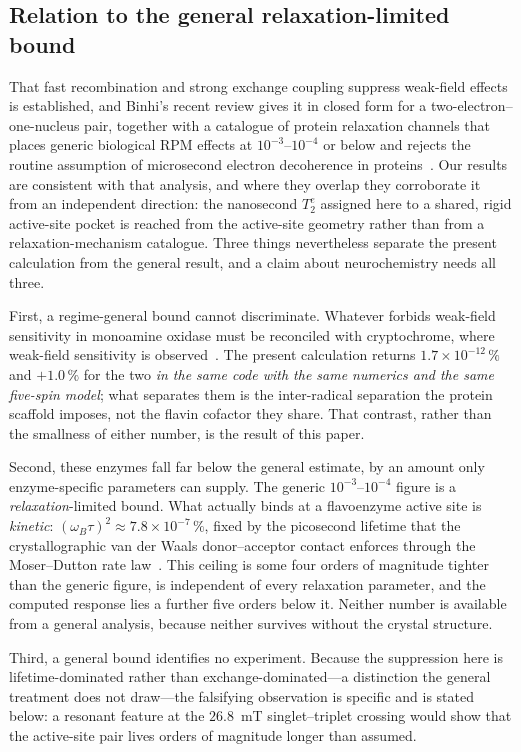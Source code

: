 \documentclass[twoside,twocolumn,9pt]{article}
\begin{document}
\subsection{Relation to the general relaxation-limited bound}

That fast recombination and strong exchange coupling suppress weak-field effects
is established, and Binhi's recent review gives it in closed form for a
two-electron--one-nucleus pair, together with a catalogue of protein relaxation
channels that places generic biological RPM effects at $10^{-3}$--$10^{-4}$ or
below and rejects the routine assumption of microsecond electron decoherence in
proteins~\cite{Binhi2025}. Our results are consistent with that analysis, and
where they overlap they corroborate it from an independent direction: the
nanosecond $T_2^e$ assigned here to a shared, rigid active-site pocket is reached
from the active-site geometry rather than from a relaxation-mechanism catalogue.
Three things nevertheless separate the present calculation from the general
result, and a claim about neurochemistry needs all three.

First, a regime-general bound cannot discriminate. Whatever forbids weak-field
sensitivity in monoamine oxidase must be reconciled with cryptochrome, where
weak-field sensitivity is observed~\cite{Maeda2012}. The present calculation
returns $1.7\times10^{-12}\,\%$ and $+1.0\,\%$ for the two \emph{in the same code
with the same numerics and the same five-spin model}; what separates them is the
inter-radical separation the protein scaffold imposes, not the flavin cofactor
they share. That contrast, rather than the smallness of either number, is the
result of this paper.

Second, these enzymes fall far below the general estimate, by an amount only
enzyme-specific parameters can supply. The generic $10^{-3}$--$10^{-4}$ figure is
a \emph{relaxation}-limited bound. What actually binds at a flavoenzyme active
site is \emph{kinetic}: $(\omega_B\tau)^2 \approx 7.8\times10^{-7}\,\%$, fixed by
the picosecond lifetime that the crystallographic van der Waals donor--acceptor
contact enforces through the Moser--Dutton rate law~\cite{Moser1992}. This
ceiling is some four orders of magnitude tighter than the generic figure, is
independent of every relaxation parameter, and the computed response lies a
further five orders below it. Neither number is available from a general
analysis, because neither survives without the crystal structure.

Third, a general bound identifies no experiment. Because the suppression here is
lifetime-dominated rather than exchange-dominated---a distinction the general
treatment does not draw---the falsifying observation is specific and is stated
below: a resonant feature at the $26.8$~mT singlet--triplet crossing would show
that the active-site pair lives orders of magnitude longer than assumed.
\end{document}
